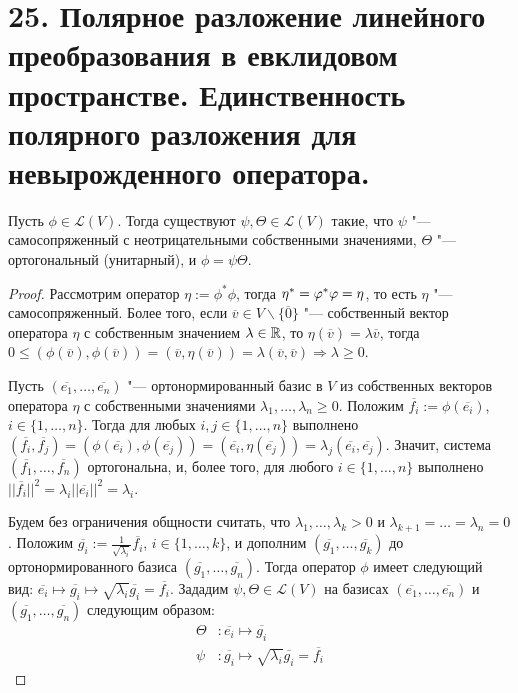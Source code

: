\section{25. Полярное разложение линейного преобразования в евклидовом пространстве. Единственность полярного разложения для невырожденного оператора.}

\begin{theorem}
	Пусть $\phi \in \mathcal{L}(V)$. Тогда существуют $\psi, \Theta \in \mathcal{L}(V)$ такие, что $\psi$ "--- самосопряженный с неотрицательными собственными значениями, $\Theta$ "--- ортогональный (унитарный), и $\phi = \psi\Theta$.
\end{theorem}

\begin{proof}
	Рассмотрим оператор $\eta := \phi^*\phi$, тогда $\eta^* = \phi^*\phi \hm{=} \eta$, то есть $\eta$ "--- самосопряженный. Более того, если $\overline{v} \in V \backslash \{\overline{0}\}$ "--- собственный вектор оператора $\eta$ с собственным значением $\lambda \in \mathbb{R}$, то $\eta(\overline{v}) = \lambda\overline{v}$, тогда $0 \le (\phi(\overline{v}), \phi(\overline{v})) = (\overline{v}, \eta(\overline{v})) = \lambda(\overline{v}, \overline{v}) \Rightarrow \lambda \ge 0$.
	
	Пусть $(\overline{e_1}, \dots, \overline{e_n})$ "--- ортонормированный базис в $V$ из собственных векторов оператора $\eta$ с собственными значениями $\lambda_1, \dotsc, \lambda_n \ge 0$. Положим $\overline{f_i} := \phi(\overline{e_i})$, $i \in \{1, \dotsc, n\}$. Тогда для любых $i, j \in \{1, \dots, n\}$ выполнено $(\overline{f_i}, \overline{f_j}) = (\phi(\overline{e_i}), \phi(\overline{e_j})) = (\overline{e_i}, \eta(\overline{e_j})) = \lambda_j(\overline{e_i}, \overline{e_j})$. Значит, система $(\overline{f_1}, \dots, \overline{f_n})$ ортогональна, и, более того, для любого $i \in \{1, \dotsc, n\}$ выполнено $||\overline{f_i}||^2 = \lambda_i||\overline{e_i}||^2 = \lambda_i$.
	
	Будем без ограничения общности считать, что $\lambda_1, \dots, \lambda_k > 0$ и $\lambda_{k + 1} = \dots = \lambda_n = 0$. Положим $\overline{g_i} := \frac{1}{\sqrt{\lambda_i}}\overline{f_i}$, $i \in \{1, \dots, k\}$, и дополним $(\overline{g_1}, \dots, \overline{g_k})$ до ортонормированного базиса $(\overline{g_1}, \dots, \overline{g_n})$. Тогда оператор $\phi$ имеет следующий вид:
	$\overline{e_i} \mapsto \overline{g_i} \mapsto \sqrt{\lambda_{i}}\overline{g_i} = \overline{f_i}$. Зададим $\psi, \Theta \in \mathcal{L}(V)$ на базисах $(\overline{e_1}, \dots, \overline{e_n})$ и $(\overline{g_1}, \dots, \overline{g_n})$ следующим образом:
	\begin{align*}
		\Theta&: \overline{e_i} \mapsto \overline{g_i}\\
		\psi&: \overline{g_i} \mapsto \sqrt{\lambda_{i}}\overline{g_i} = \overline{f_i}
	\end{align*}
	

\end{proof}
